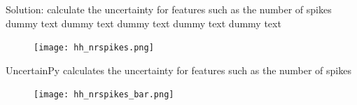 \documentclass[presentation]{beamer}
\begin{document}
\begin{frame}{Solution: calculate the uncertainty for features such as the number of spikes {\color{white} dummy text dummy text dummy text dummy text dummy text} }
\vspace{-5mm}
\begin{figure}
   \texttt{[image: hh\_nrspikes.png]}
\end{figure}
\end{frame}

\begin{frame}{UncertainPy calculates the uncertainty for features such as the number of spikes}
\vspace{-5mm}
\begin{figure}
   \texttt{[image: hh\_nrspikes\_bar.png]}
\end{figure}
\end{frame}


\end{document}
